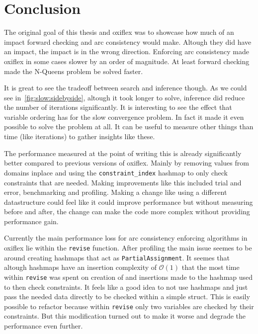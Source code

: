 
\chapter{Conclusion}

The original goal of this thesis and oxiflex was to showcase how much of an impact forward checking and arc consistency would make. Altough they did have an impact, the impact is in the wrong direction. Enforcing arc consistency made oxiflex in some cases slower by an order of magnitude. At least forward checking made the N-Queens problem be solved faster.

It is great to see the tradeoff between search and inference though. As we could see in~\cref{fig:slow:sidebyside}, altough it took longer to solve, inference did reduce the number of iterations significantly. It is interesting to see the effect that variable ordering has for the slow convergence problem. In fact it made it even possible to solve the problem at all. It can be useful to measure other things than time (like iterations) to gather insights like these.

The performance measured at the point of writing this is already significantly better compared to previous versions of oxiflex. Mainly by removing values from domains inplace and using the \verb|constraint_index| hashmap to only check constraints that are needed. Making improvements like this included trial and error, benchmarking and profiling. Making a change like using a different datastructure could feel like it could improve performance but without measuring before and after, the change can make the code more complex without providing performance gain.

Currently the main performance loss for arc consistency enforcing algorithms in oxiflex lie within the \verb|revise| function. After profiling the main issue seemes to be around creating hashmaps that act as \verb|PartialAssignment|. It seemes that altough hashmaps have an insertion complexity of $\mathcal{O}(1)$ that the most time within \verb|revise| was spent on creation of and insertions made to the hashmap used to then check constraints. It feels like a good idea to not use hashmaps and just pass the needed data directly to be checked within a simple struct. This is easily possible to refactor because within \verb|revise| only two variables are checked by their constraints. But this modification turned out to make it worse and degrade the performance even further.

